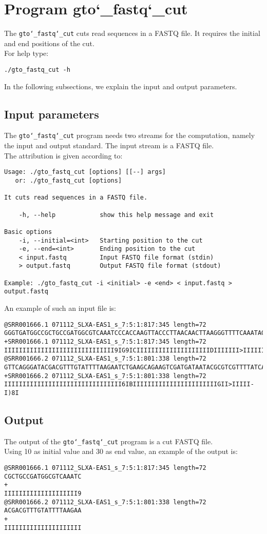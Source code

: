 \section{Program gto\char`_fastq\char`_cut}
The \texttt{gto\char`_fastq\char`_cut} cuts read sequences in a FASTQ file. It requires the initial and end positions of the cut.\\
For help type:
\begin{lstlisting}
./gto_fastq_cut -h
\end{lstlisting}
In the following subsections, we explain the input and output parameters.

\subsection*{Input parameters}

The \texttt{gto\char`_fastq\char`_cut} program needs two streams for the computation, namely the input and output standard. The input stream is a FASTQ file.\\
The attribution is given according to:
\begin{lstlisting}
Usage: ./gto_fastq_cut [options] [[--] args]
   or: ./gto_fastq_cut [options]

It cuts read sequences in a FASTQ file.

    -h, --help            show this help message and exit

Basic options
    -i, --initial=<int>   Starting position to the cut
    -e, --end=<int>       Ending position to the cut
    < input.fastq         Input FASTQ file format (stdin)
    > output.fastq        Output FASTQ file format (stdout)

Example: ./gto_fastq_cut -i <initial> -e <end> < input.fastq > output.fastq
\end{lstlisting}
An example of such an input file is:
\begin{lstlisting}
@SRR001666.1 071112_SLXA-EAS1_s_7:5:1:817:345 length=72
GGGTGATGGCCGCTGCCGATGGCGTCAAATCCCACCAAGTTACCCTTAACAACTTAAGGGTTTTCAAATAGA
+SRR001666.1 071112_SLXA-EAS1_s_7:5:1:817:345 length=72
IIIIIIIIIIIIIIIIIIIIIIIIIIIIII9IG9ICIIIIIIIIIIIIIIIIIIIIDIIIIIII>IIIIII/
@SRR001666.2 071112_SLXA-EAS1_s_7:5:1:801:338 length=72
GTTCAGGGATACGACGTTTGTATTTTAAGAATCTGAAGCAGAAGTCGATGATAATACGCGTCGTTTTATCAT
+SRR001666.2 071112_SLXA-EAS1_s_7:5:1:801:338 length=72
IIIIIIIIIIIIIIIIIIIIIIIIIIIIIIII6IBIIIIIIIIIIIIIIIIIIIIIIIGII>IIIII-I)8I
\end{lstlisting}

\subsection*{Output}
The output of the \texttt{gto\char`_fastq\char`_cut} program is a cut FASTQ file.\\
Using 10 as initial value and 30 as end value, an example of the output is:
\begin{lstlisting}
@SRR001666.1 071112_SLXA-EAS1_s_7:5:1:817:345 length=72
CGCTGCCGATGGCGTCAAATC
+
IIIIIIIIIIIIIIIIIIII9
@SRR001666.2 071112_SLXA-EAS1_s_7:5:1:801:338 length=72
ACGACGTTTGTATTTTAAGAA
+
IIIIIIIIIIIIIIIIIIIII
\end{lstlisting}